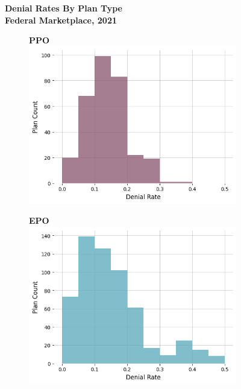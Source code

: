 \documentclass[12pt, a4paper,twoside,parskip=full]{report}
\theoremstyle{plain} %
\theoremstyle{definition} %
\theoremstyle{remark} %
\numberwithin{equation}{chapter}
\begin{document}
		
				\begin{figure}
					\centering
					\textbf{Denial Rates By Plan Type}\\
					\textbf{Federal Marketplace, 2021}\\
					\vspace{3em}
					\centering
					\begin{subfigure}[t]{0.49\textwidth}
						\centering
						\textbf{PPO}
						\includegraphics[width=\textwidth]{images/cms_puf/PPO_dist.png}
					\end{subfigure}
					\hfill
					\begin{subfigure}[t]{0.49\textwidth}
						\centering
						\textbf{EPO}
						\includegraphics[width=\textwidth]{images/cms_puf/EPO_dist.png}

\end{subfigure}
\end{figure}
\end{document}
